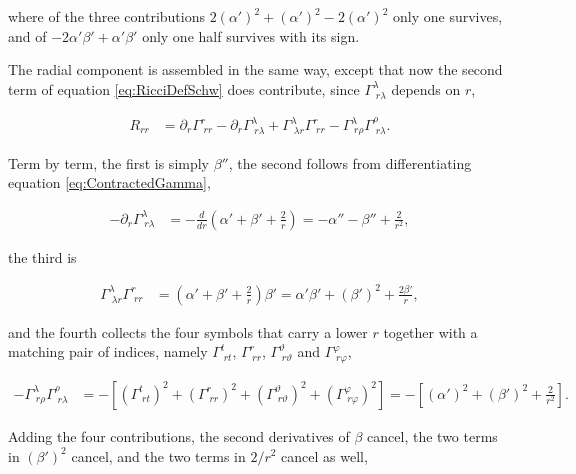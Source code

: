         where of the three contributions $2(\alpha')^2 + (\alpha')^2 - 2(\alpha')^2$ only one survives, and of $-2\alpha'\beta' + \alpha'\beta'$ only one half survives with its sign.

        The radial component is assembled in the same way, except that now the second term of equation \ref{eq:RicciDefSchw} does contribute, since $\Gamma^{\lambda}_{\;r\lambda}$ depends on $r$,

        \begin{align*}
            R_{rr} &= \partial_r\Gamma^{r}_{\;rr} - \partial_r\Gamma^{\lambda}_{\;r\lambda} + \Gamma^{\lambda}_{\;\lambda r}\Gamma^{r}_{\;rr} - \Gamma^{\lambda}_{\;r\rho}\Gamma^{\rho}_{\;r\lambda}.
        \end{align*}

        Term by term, the first is simply $\beta''$, the second follows from differentiating equation \ref{eq:ContractedGamma},

        \begin{align*}
            -\partial_r\Gamma^{\lambda}_{\;r\lambda} &= -\frac{d}{dr}\left(\alpha'+\beta'+\frac{2}{r}\right) = -\alpha'' - \beta'' + \frac{2}{r^2},
        \end{align*}

        the third is

        \begin{align*}
            \Gamma^{\lambda}_{\;\lambda r}\Gamma^{r}_{\;rr} &= \left(\alpha'+\beta'+\frac{2}{r}\right)\beta' = \alpha'\beta' + (\beta')^2 + \frac{2\beta'}{r},
        \end{align*}

        and the fourth collects the four symbols that carry a lower $r$ together with a matching pair of indices, namely $\Gamma^t_{\;rt}$, $\Gamma^r_{\;rr}$, $\Gamma^{\vartheta}_{\;r\vartheta}$ and $\Gamma^{\varphi}_{\;r\varphi}$,

        \begin{align*}
            -\Gamma^{\lambda}_{\;r\rho}\Gamma^{\rho}_{\;r\lambda} &= -\left[\left(\Gamma^{t}_{\;rt}\right)^2 + \left(\Gamma^{r}_{\;rr}\right)^2 + \left(\Gamma^{\vartheta}_{\;r\vartheta}\right)^2 + \left(\Gamma^{\varphi}_{\;r\varphi}\right)^2\right] = -\left[(\alpha')^2 + (\beta')^2 + \frac{2}{r^2}\right].
        \end{align*}

        Adding the four contributions, the second derivatives of $\beta$ cancel, the two terms in $(\beta')^2$ cancel, and the two terms in $2/r^2$ cancel as well,

